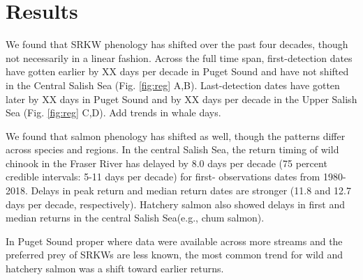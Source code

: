 \documentclass{article}
\begin{document}
\section*{Results}
\par We found that SRKW phenology has shifted over the past four decades, though not necessarily in a linear fashion. Across the full time span, first-detection dates have gotten earlier by XX days per decade in Puget Sound and have not shifted in the Central Salish Sea (Fig. \ref{fig:reg} A,B). 
Last-detection dates have gotten later by XX days in Puget Sound and by XX days per decade in the Upper Salish Sea (Fig. \ref{fig:reg} C,D). Add trends in whale days. %
\par We found that salmon phenology has shifted as well, though the patterns differ across species and regions. In the central Salish Sea, the return timing of wild chinook in the Fraser River has delayed by 8.0 days per decade (75 percent credible intervals: 5-11 days per decade) for first- observations dates from 1980-2018.  Delays in peak return and median return dates are stronger (11.8 and 12.7 days per decade, respectively). Hatchery salmon also showed delays in first and median returns in the central Salish Sea(e.g., chum salmon).
\par In Puget Sound proper where data were available across more streams and the preferred prey of SRKWs are less known, the most common trend for wild and hatchery salmon was a shift toward earlier returns.
\end{document}
